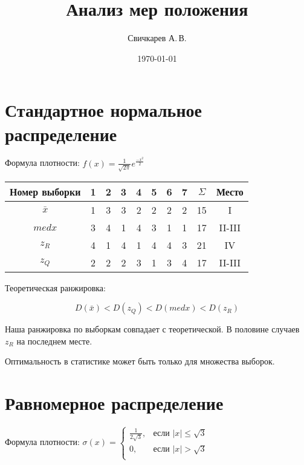 \documentclass{article} %
\title{Анализ мер положения} %
\author{Свичкарев А.\,В.} %
\date{\today} %
\begin{document}

\maketitle %

\section{Стандартное нормальное распределение}

Формула плотности:
\( f(x) = \frac{1}{\sqrt{ 2\pi }}e^{\frac{-x^2}{2}} \)

\begin{center}
	\begin{tabular}{|c| c|c|c|c|c|c|c| c|c|} \hline
		Номер выборки & 1 & 2 & 3 & 4 & 5 & 6 & 7 & \(\Sigma\) & Место \\ \hline
		\(\bar{x}\) & 1 & 3 & 3 & 2 & 2 & 2 & 2 & 15 & I \\ \hline
		\(medx\) & 3 & 4 & 1 & 4 & 3 & 1 & 1 & 17 & II-III \\ \hline
		\(z_R\) & 4 & 1 & 4 & 1 & 4 & 4 & 3 & 21 & IV \\ \hline
		\(z_Q\) & 2 & 2 & 2 & 3 & 1 & 3 & 4 & 17 & II-III \\ \hline
	\end{tabular}
\end{center}

Теоретическая ранжировка:

\[ D(\bar{x}) < D(z_Q) < D(medx) < D(z_R) \]

Наша ранжировка по выборкам совпадает с теоретической. В половине случаев \(z_R\) на последнем месте.

Оптимальность в статистике может быть только для множества выборок.

\section{Равномерное распределение}
Формула плотности:
\( \sigma(x) = \left\{
	\begin{array}{cl}
		\frac{1}{2\sqrt{3}}, & \mbox{если } \lvert x \rvert \leq \sqrt{3} \\
		0, & \mbox{если } \lvert x \rvert > \sqrt{3}  \\
\end{array} \right. \)
\end{document}
